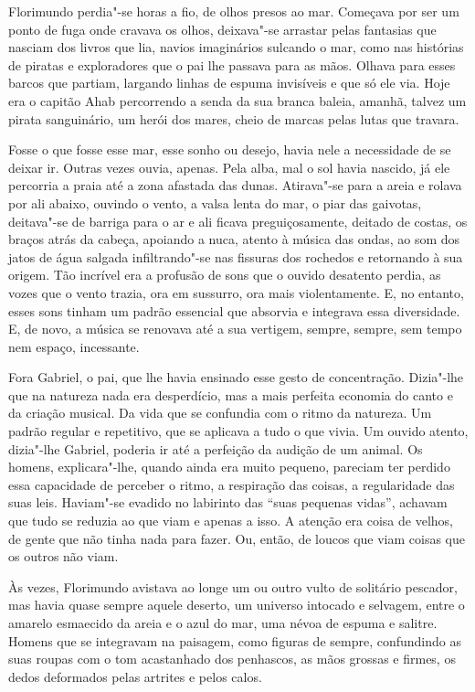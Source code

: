 Florimundo perdia"-se horas a fio, de olhos presos ao mar. Começava por
ser um ponto de fuga onde cravava os olhos, deixava"-se arrastar pelas
fantasias que nasciam dos livros que lia, navios imaginários sulcando o
mar, como nas histórias de piratas e exploradores que o pai lhe passava
para as mãos. Olhava para esses barcos que partiam, largando linhas de
espuma invisíveis e que só ele via. Hoje era o capitão Ahab percorrendo
a senda da sua branca baleia, amanhã, talvez um pirata sanguinário, um
herói dos mares, cheio de marcas pelas lutas que travara.

Fosse o que fosse esse mar, esse sonho ou desejo, havia nele a
necessidade de se deixar ir. Outras vezes ouvia, apenas. Pela alba, mal
o sol havia nascido, já ele percorria a praia até a zona afastada das
dunas. Atirava"-se para a areia e rolava por ali abaixo, ouvindo o vento,
a valsa lenta do mar, o piar das gaivotas, deitava"-se de barriga para o
ar e ali ficava preguiçosamente, deitado de costas, os braços atrás da
cabeça, apoiando a nuca, atento à música das ondas, ao som dos jatos de
água salgada infiltrando"-se nas fissuras dos rochedos e retornando à sua
origem. Tão incrível era a profusão de sons que o ouvido desatento
perdia, as vozes que o vento trazia, ora em sussurro, ora mais
violentamente. E, no entanto, esses sons tinham um padrão essencial que
absorvia e integrava essa diversidade. E, de novo, a música se renovava
até a sua vertigem, sempre, sempre, sem tempo nem espaço, incessante.

Fora Gabriel, o pai, que lhe havia ensinado esse gesto de concentração.
Dizia"-lhe que na natureza nada era desperdício, mas a mais perfeita
economia do canto e da criação musical. Da vida que se confundia com o
ritmo da natureza. Um padrão regular e repetitivo, que se aplicava a
tudo o que vivia. Um ouvido atento, dizia"-lhe Gabriel, poderia ir até a
perfeição da audição de um animal. Os homens, explicara"-lhe, quando
ainda era muito pequeno, pareciam ter perdido essa capacidade de
perceber o ritmo, a respiração das coisas, a regularidade das suas leis.
Haviam"-se evadido no labirinto das ``suas pequenas vidas'', achavam que
tudo se reduzia ao que viam e apenas a isso. A atenção era coisa de
velhos, de gente que não tinha nada para fazer. Ou, então, de loucos que
viam coisas que os outros não viam.

Às vezes, Florimundo avistava ao longe um ou outro vulto de solitário
pescador, mas havia quase sempre aquele deserto, um universo intocado e
selvagem, entre o amarelo esmaecido da areia e o azul do mar, uma névoa
de espuma e salitre. Homens que se integravam na paisagem, como figuras
de sempre, confundindo as suas roupas com o tom acastanhado dos
penhascos, as mãos grossas e firmes, os dedos deformados pelas artrites
e pelos calos.

